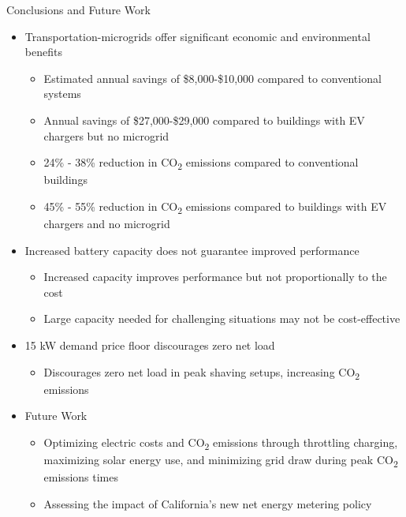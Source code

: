 \documentclass[final, 36 pt]{beamer}
\newlength{\onecolwid}
\begin{document}
\begin{frame}[t]
\begin{columns}[t]
\begin{column}{\onecolwid}

\begin{alertblock}{Conclusions and Future Work}
	\begin{itemize} 
		\item Transportation-microgrids offer significant economic and environmental benefits
		\begin{itemize} 
			\item Estimated annual savings of \$8,000-\$10,000 compared to conventional systems
			\item Annual savings of \$27,000-\$29,000 compared to buildings with EV chargers but no microgrid
			\item 24\% - 38\% reduction in CO\textsubscript{2} emissions compared to conventional buildings
			\item 45\% - 55\% reduction in CO\textsubscript{2} emissions compared to buildings with EV chargers and no microgrid
		\end{itemize}
		\item Increased battery capacity does not guarantee improved performance
		\begin{itemize} 
			\item Increased capacity improves performance but not proportionally to the cost
			\item Large capacity needed for challenging situations may not be cost-effective 
		\end{itemize}
		\item 15 kW demand price floor discourages zero net load
		\begin{itemize} 
			\item Discourages zero net load in peak shaving setups, increasing CO\textsubscript{2} emissions
		\end{itemize}
		\item Future Work
		\begin{itemize} 
			\item Optimizing electric costs and CO\textsubscript{2} emissions through throttling charging, maximizing solar energy use, and minimizing grid draw during peak CO\textsubscript{2} emissions times
			\item Assessing the impact of California's new net energy metering policy
		\end{itemize}
	\end{itemize}
\end{alertblock}



\end{column}
\end{columns}
\end{frame}
\end{document}
